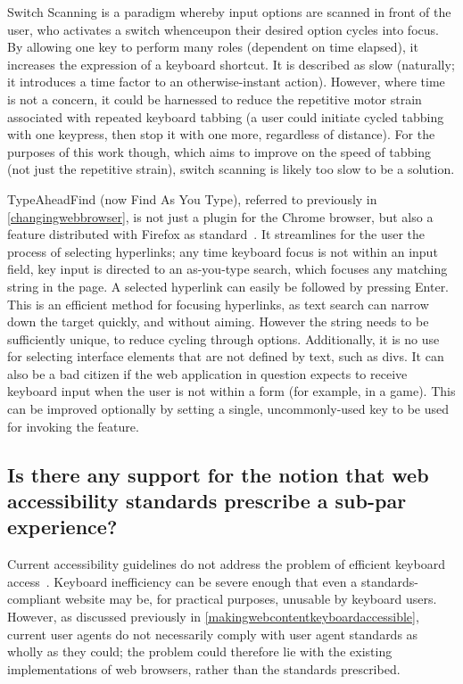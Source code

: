 \documentclass[a4paper, 11pt]{article}
\begin{document}
Switch Scanning is a paradigm whereby input options are scanned in front of the user, who activates a switch whenceupon their desired option cycles into focus\cite{hendrix1997adapting}. By allowing one key to perform many roles (dependent on time elapsed), it increases the expression of a keyboard shortcut. It is described as slow (naturally; it introduces a time factor to an otherwise-instant action). However, where time is not a concern, it could be harnessed to reduce the repetitive motor strain associated with repeated keyboard tabbing (a user could initiate cycled tabbing with one keypress, then stop it with one more, regardless of distance). For the purposes of this work though, which aims to improve on the speed of tabbing (not just the repetitive strain), switch scanning is likely too slow to be a solution.

TypeAheadFind (now Find As You Type), referred to previously in \cref{changingwebbrowser}, is not just a plugin for the Chrome browser, but also a feature distributed with Firefox as standard~\cite{firefoxshortcuts}. It streamlines for the user the process of selecting hyperlinks; any time keyboard focus is not within an input field, key input is directed to an as-you-type search, which focuses any matching string in the page. A selected hyperlink can easily be followed by pressing Enter. This is an efficient method for focusing hyperlinks, as text search can narrow down the target quickly, and without aiming. However the string needs to be sufficiently unique, to reduce cycling through options. Additionally, it is no use for selecting interface elements that are not defined by text, such as divs. It can also be a bad citizen if the web application in question expects to receive keyboard input when the user is not within a form (for example, in a game). This can be improved optionally by setting a single, uncommonly-used key to be used for invoking the feature.
\subsection{Is there any support for the notion that web accessibility standards prescribe a sub-par experience?}
\label{subparstandards}
Current accessibility guidelines do not address the problem of efficient keyboard access~\cite{schrepp2006efficiency}. Keyboard inefficiency can be severe enough that even a standards-compliant website may be, for practical purposes, unusable by keyboard users\cite{schrepp2006efficiency,coyne2001beyond,powlik2002accessibility}. However, as discussed previously in \cref{makingwebcontentkeyboardaccessible}, current user agents do not necessarily comply with user agent standards as wholly as they could; the problem could therefore lie with the existing implementations of web browsers, rather than the standards prescribed.
\end{document}
